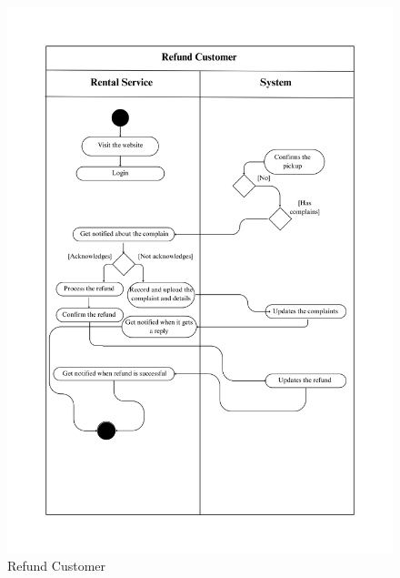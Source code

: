 \begin{figure}[h!]
    \centering
    \includegraphics[width=1\textwidth]{Images/Activity Diagrams/36 Refund Customer.png}
    \caption{Refund Customer}
\end{figure}
\newpage